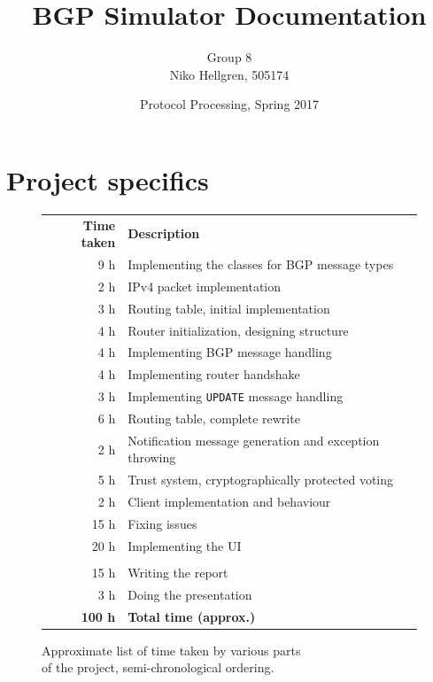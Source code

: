 \documentclass[11pt,a4paper,titlepage]{report}
\author{Group 8\\Niko Hellgren, 505174}
\title{BGP Simulator Documentation}
\date{Protocol Processing, Spring 2017}
\begin{document}
\maketitle
\tableofcontents
\pagebreak

\section{Project specifics}\label{sec:project}
\begin{figure}
\begin{center}
\begin{tabular}{r l}
\textbf{Time taken} & \textbf{Description}\\
9 h & Implementing the classes for BGP message types \\
2 h & IPv4 packet implementation \\
3 h & Routing table, initial implementation \\
4 h & Router initialization, designing structure \\
4 h & Implementing BGP message handling \\
4 h & Implementing router handshake \\
3 h & Implementing \texttt{UPDATE} message handling \\
6 h & Routing table, complete rewrite \\
2 h & Notification message generation and exception throwing \\
5 h & Trust system, cryptographically protected voting \\
2 h & Client implementation and behaviour \\
15 h & Fixing issues \\
20 h & Implementing the UI \\
\vspace{1mm} \\
15 h & Writing the report \\
3 h & Doing the presentation \\
\hline
\textbf{100 h} & \textbf{Total time (approx.)}
\end{tabular}
\end{center}
\caption{Approximate list of time taken by various parts\\of the project, semi-chronological ordering.}
\label{fig:timetaken}
\end{figure}
\end{document}
